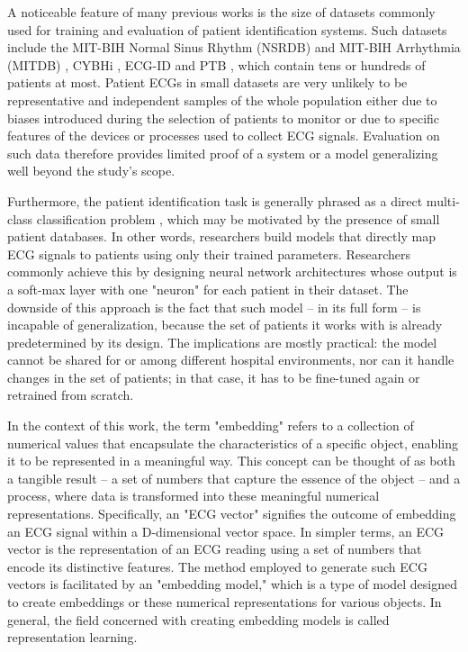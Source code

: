 \documentclass[preprint,12pt]{elsarticle}
\begin{document}
A noticeable feature of many previous works is the size of datasets commonly used for training and evaluation of patient identification systems. Such datasets include the MIT-BIH Normal Sinus Rhythm (NSRDB) and MIT-BIH Arrhythmia (MITDB)  \cite{moody2001impact, goldberger2000physiobank}, CYBHi \cite{da2014check}, ECG-ID \cite{lugovaya2005biometric} and PTB \cite{bousseljot1995nutzung}, which contain tens or hundreds of patients at most. Patient ECGs in small datasets are very unlikely to be representative and independent samples of the whole population either due to biases introduced during the selection of patients to monitor or due to specific features of the devices or processes used to collect ECG signals. Evaluation on such data therefore provides limited proof of a system or a model generalizing well beyond the study's scope. 

Furthermore, the patient identification task is generally phrased as a direct multi-class classification problem \cite{melzi2023ecg, labati2019deep, hammad2021resnet, jyotishi2020lstm, jyotishi2021ecg, ghazarian2022assessing}, which may be motivated by the presence of small patient databases. In other words, researchers build models that directly map ECG signals to patients using only their trained parameters. Researchers commonly achieve this by designing neural network architectures whose output is a soft-max layer with one "neuron" for each patient in their dataset. The downside of this approach is the fact that such model -- in its full form -- is incapable of generalization, because the set of patients it works with is already predetermined by its design. The implications are mostly practical: the model cannot be shared for or among different hospital environments, nor can it handle changes in the set of patients; in that case, it has to be fine-tuned again or retrained from scratch.

In the context of this work, the term "embedding" refers to a collection of numerical values that encapsulate the characteristics of a specific object, enabling it to be represented in a meaningful way. This concept can be thought of as both a tangible result – a set of numbers that capture the essence of the object – and a process, where data is transformed into these meaningful numerical representations. Specifically, an "ECG vector" signifies the outcome of embedding an ECG signal within a D-dimensional vector space. In simpler terms, an ECG vector is the representation of an ECG reading using a set of numbers that encode its distinctive features. The method employed to generate such ECG vectors is facilitated by an "embedding model," which is a type of model designed to create embeddings or these numerical representations for various objects. In general, the field concerned with creating embedding models is called representation learning. 
\end{document}
